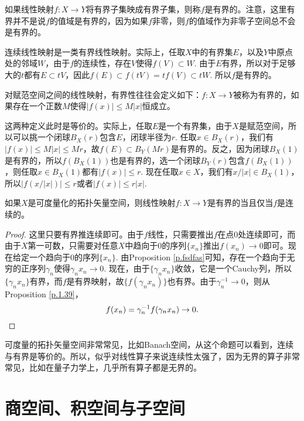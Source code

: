 \begin{para}
	如果线性映射$f:X\to Y$将有界子集映成有界子集，则称$f$是有界的。注意，这里有界并不是说$f$的值域是有界的，因为如果$f$非零，则$f$的值域作为非零子空间总不会是有界的。

	连续线性映射是一类有界线性映射。实际上，任取$X$中的有界集$E$，以及$Y$中原点处的邻域$W$，由于$f$的连续性，存在$V$使得$f(V)\subset W$. 由于$E$有界，所以对于足够大的$t$都有$E\subset tV$，因此$f(E)\subset f(tV)=tf(V)\subset tW$. 所以$f$是有界的。

	对赋范空间之间的线性映射，有界性往往会定义如下：$f:X\to Y$被称为有界的，如果存在一个正数$M$使得$|f(x)|\leq M|x|$恒成立。

	这两种定义此时是等价的。实际上，任取$E$是一个有界集，由于$X$是赋范空间，所以可以挑一个闭球$B_X(r)$包含$E$，闭球半径为$r$.  
	任取$x\in B_X(r)$，我们有$|f(x)|\leq M|x|\leq Mr$，故$f(E)\subset B_Y(Mr)$是有界的。反之，因为闭球$B_X(1)$是有界的，所以$f(B_X(1))$也是有界的，选一个闭球$B_Y(r)$包含$f(B_X(1))$，则任取$x\in B_X(1)$都有$|f(x)|\leq r$. 现在任取$x\in X$，我们有$x/|x|\in B_X(1)$，所以$|f(x/|x|)| \leq r$或者$|f(x)|\leq r|x|$.
\end{para}

\begin{pro}\label{1.42}
	如果$X$是可度量化的拓扑矢量空间，则线性映射$f:X\to Y$是有界的当且仅当$f$是连续的。
\end{pro}

\begin{proof}
	这里只要有界推连续即可。由于$f$线性，只需要推出$f$在点$0$处连续即可，而由于$X$第一可数，只需要对任意$X$中趋向于$0$的序列$\{x_n\}$推出$f(x_n)\to 0$即可。现在给定一个趋向于$0$的序列$\{x_n\}$. 由Proposition \ref{p.fsdfas}可知，存在一个趋向于无穷的正序列$\gamma_n$使得$\gamma_nx_n\to 0$. 现在，由于$\{\gamma_nx_n\}$收敛，它是一个Cauchy列，所以$\{\gamma_nx_n\}$有界，而$f$是有界映射，故$\{f(\gamma_nx_n)\}$也有界。由于$\gamma^{-1}_n\to 0$，则从Proposition \ref{p.1.39}，
	\[
	f(x_n)=\gamma_n^{-1}f(\gamma_n x_n)\to 0.\qedhere
	\]
\end{proof}

可度量的拓扑矢量空间非常常见，比如Banach空间，从这个命题可以看到，连续与有界是等价的。所以，似乎对线性算子来说连续性太强了，因为无界的算子非常常见，比如在量子力学上，几乎所有算子都是无界的。

\section{商空间、积空间与子空间}

